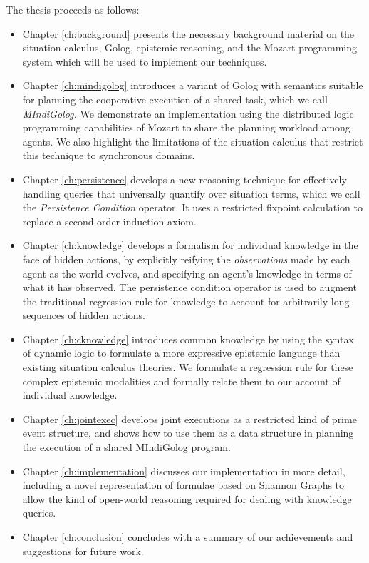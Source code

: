 The thesis proceeds as follows:

\begin{itemize}
\item Chapter \ref{ch:background} presents the necessary background material
on the situation calculus, Golog, epistemic reasoning, and the Mozart
programming system which will be used to implement our techniques. 
\item Chapter \ref{ch:mindigolog} introduces a variant of Golog with semantics
suitable for planning the cooperative execution of a shared task,
which we call \emph{MIndiGolog.} We demonstrate an implementation
using the distributed logic programming capabilities of Mozart to
share the planning workload among agents. We also highlight the limitations
of the situation calculus that restrict this technique to synchronous
domains. 
\item Chapter \ref{ch:persistence} develops a new reasoning technique for
effectively handling queries that universally quantify over situation
terms, which we call the \emph{Persistence Condition} operator. It
uses a restricted fixpoint calculation to replace a second-order induction
axiom. 
\item Chapter \ref{ch:knowledge} develops a formalism for individual knowledge
in the face of hidden actions, by explicitly reifying the \emph{observations}
made by each agent as the world evolves, and specifying an agent's
knowledge in terms of what it has observed. The persistence condition
operator is used to augment the traditional regression rule for knowledge
to account for arbitrarily-long sequences of hidden actions. 
\item Chapter \ref{ch:cknowledge} introduces common knowledge by using
the syntax of dynamic logic to formulate a more expressive epistemic
language than existing situation calculus theories. We formulate a
regression rule for these complex epistemic modalities and formally
relate them to our account of individual knowledge. 
\item Chapter \ref{ch:jointexec} develops joint executions as a restricted
kind of prime event structure, and shows how to use them as a data
structure in planning the execution of a shared MIndiGolog program. 
\item Chapter \ref{ch:implementation} discusses our implementation in more
detail, including a novel representation of formulae based on Shannon
Graphs to allow the kind of open-world reasoning required for dealing
with knowledge queries. 
\item Chapter \ref{ch:conclusion} concludes with a summary of our achievements
and suggestions for future work. 
\end{itemize}
